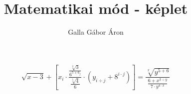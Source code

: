 \documentclass[12pt,a4paper]{beamer}
\author{Galla Gábor Áron}
\title{Matematikai mód - képlet}
\begin{document}
\begin{frame}

\begin{Large}

$$\sqrt{x-3}+\left[x_i \cdot \frac{\frac{\sqrt[2]{3}}{6^{5+6_j}}}{\frac{\sqrt[5]{4}}{6}} \cdot \left(y_{i \div j}+8^{i \cdot j} \right) \right] = \frac{\sqrt[x]{y^{5+6}}}{\frac{6+x^{3 \div y}}{7 \cdot y^{4 \cdot x}}} $$

\end{Large}

\end{frame}
\end{document}
